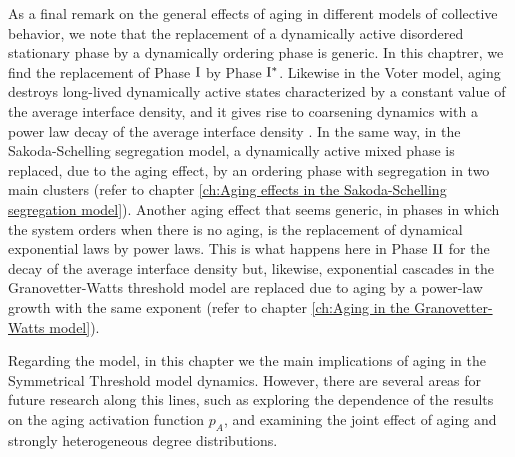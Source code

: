 As a final remark on the general effects of aging in different models of collective behavior, we note that the replacement of a dynamically active disordered stationary phase by a dynamically ordering phase is generic. In this chaptrer, we find the replacement of Phase ${\rm I}$ by Phase ${\rm I}^{*}$. Likewise in the Voter model, aging destroys long-lived dynamically active states characterized by a constant value of the average interface density, and it gives rise to coarsening dynamics with a power law decay of the average interface density \cite{fernandez-gracia-2011}. In the same way, in the Sakoda-Schelling segregation model, a dynamically active mixed phase is replaced, due to the aging effect, by an ordering phase with segregation in two main clusters (refer to chapter \ref{ch:Aging effects in the Sakoda-Schelling segregation model}). 
Another aging effect that seems generic, in phases in which the system orders when there is no aging, is the replacement of dynamical exponential laws by power laws. This is what happens here in  Phase ${\rm II}$ for the decay of the average interface density but, likewise, exponential cascades in the Granovetter-Watts threshold model are replaced due to aging by a power-law growth with the same exponent (refer to chapter \ref{ch:Aging in the Granovetter-Watts model}).

Regarding the model,  in this chapter we the main implications of aging in the Symmetrical Threshold model dynamics. However, there are several areas for future research along this lines, such as exploring the dependence of the results on the aging activation function $p_A$, and examining the joint effect of aging and strongly heterogeneous degree distributions.